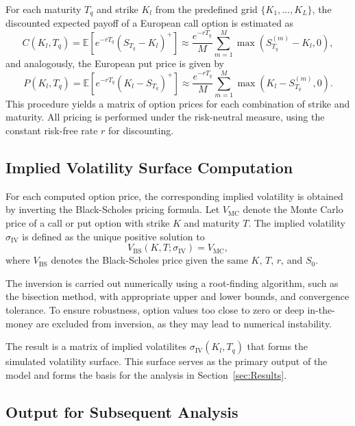 For each maturity $T_q$ and strike $K_l$ from the predefined grid $\{K_1,\ldots,K_L\}$, the discounted expected payoff of a European call option is estimated as
\begin{equation}
    C(K_l, T_q) = \mathbb{E}\left[ e^{-rT_q} (S_{T_q} - K_l)^+ \right] \approx \frac{e^{-rT_q}}{M} \sum_{m=1}^M \max\left(S_{T_q}^{(m)} - K_l, 0\right),
\end{equation}
and analogously, the European put price is given by
\begin{equation}
    P(K_l, T_q) = \mathbb{E}\left[ e^{-rT_q} (K_l - S_{T_q})^+ \right] \approx \frac{e^{-rT_q}}{M} \sum_{m=1}^M \max\left(K_l - S_{T_q}^{(m)}, 0\right).
\end{equation}
This procedure yields a matrix of option prices for each combination of strike and maturity. All pricing is performed under the risk-neutral measure, using the constant risk-free rate $r$ for discounting.


\subsection{Implied Volatility Surface Computation} \label{subsec: Implied Volatility Surface Computation}

For each computed option price, the corresponding implied volatility is obtained by inverting the Black-Scholes pricing formula. Let $V_{\text{MC}}$ denote the Monte Carlo price of a call or put option with strike $K$ and maturity $T$. The implied volatility $\sigma_{\text{IV}}$ is defined as the unique positive solution to
\begin{equation}
    V_{\text{BS}}(K, T; \sigma_{\text{IV}}) = V_{\text{MC}},
\end{equation}
where $V_{\text{BS}}$ denotes the Black-Scholes price given the same $K$, $T$, $r$, and $S_0$.

The inversion is carried out numerically using a root-finding algorithm, such as the bisection method, with appropriate upper and lower bounds, and convergence tolerance. To ensure robustness, option values too close to zero or deep in-the-money are excluded from inversion, as they may lead to numerical instability.

The result is a matrix of implied volatilites $\sigma_{\text{IV}}(K_l,T_q)$ that forms the simulated volatility surface. This surface serves as the primary output of the model and forms the basis for the analysis in Section~\ref{sec:Results}.


\subsection{Output for Subsequent Analysis} \label{subsec: Output for Subsequent Analysis}

